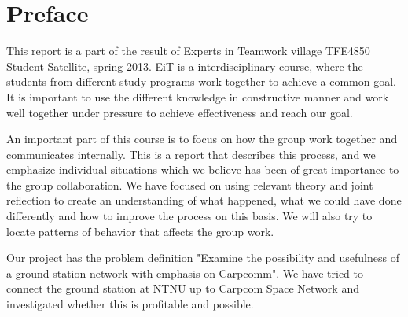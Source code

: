 \section*{Preface}

This report is a part of the result of Experts in Teamwork village TFE4850 Student Satellite, spring 2013. EiT is a interdisciplinary course, where the students from different study programs work together to achieve a common goal. It is important to use the different knowledge in constructive manner and work well together under pressure to achieve effectiveness and reach our goal. 

An important part of this course is to focus on how the group work together and communicates internally. This is a report that describes this process, and we emphasize individual situations which we believe has been of great importance to the group collaboration. We have focused on using relevant theory and joint reflection to create an understanding of what happened,  what we could have done differently and how to improve the process on this basis. We will also try to locate patterns of behavior that affects the group work. 

Our project has the problem definition "Examine the possibility and usefulness of a ground station network with emphasis on Carpcomm". We have tried to connect the ground station at NTNU up to Carpcom Space Network and investigated whether this is profitable and possible. 



